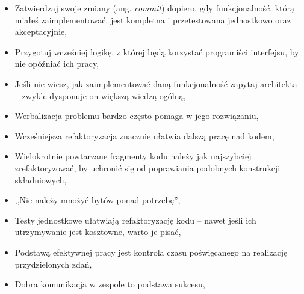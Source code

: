 \begin{description}
\begin{itemize}
\item Zatwierdzaj swoje zmiany (ang. \emph{commit}) dopiero, gdy funkcjonalność, którą miałeś zaimplementować, jest kompletna i przetestowana jednostkowo oraz akceptacyjnie,
\item Przygotuj wcześniej logikę, z której będą korzystać programiści interfejsu, by nie opóźniać ich pracy,
\item Jeśli nie wiesz, jak zaimplementować daną funkcjonalność zapytaj architekta -- zwykle dysponuje on większą wiedzą ogólną,
\item Werbalizacja problemu bardzo często pomaga w jego rozwiązaniu,
\item Wcześniejsza refaktoryzacja znacznie ułatwia dalszą pracę nad kodem,
\item Wielokrotnie powtarzane fragmenty kodu należy jak najszybciej zrefaktoryzować, by uchronić się od poprawiania podobnych konstrukcji składniowych,
\item ,,Nie należy mnożyć bytów ponad potrzebę'',
\item Testy jednostkowe ułatwiają refaktoryzację kodu -- nawet jeśli ich utrzymywanie jest kosztowne, warto je pisać,
\item Podstawą efektywnej pracy jest kontrola czasu poświęcanego na realizację przydzielonych zdań,
\item Dobra komunikacja w zespole to podstawa sukcesu,
\end{itemize}
\end{description}
